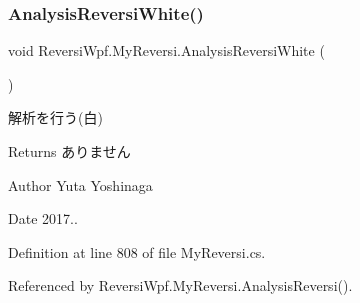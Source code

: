 \subsubsection{\texorpdfstring{Analysis\+Reversi\+White()}{AnalysisReversiWhite()}}
{\footnotesize\ttfamily void Reversi\+Wpf.\+My\+Reversi.\+Analysis\+Reversi\+White (\begin{DoxyParamCaption}{ }\end{DoxyParamCaption})\hspace{0.3cm}{\ttfamily [private]}}



解析を行う(白) 

\begin{DoxyReturn}{Returns}
ありません 
\end{DoxyReturn}
\begin{DoxyAuthor}{Author}
Yuta Yoshinaga 
\end{DoxyAuthor}
\begin{DoxyDate}{Date}
2017.. 
\end{DoxyDate}


Definition at line 808 of file My\+Reversi.\+cs.



Referenced by Reversi\+Wpf.\+My\+Reversi.\+Analysis\+Reversi().

